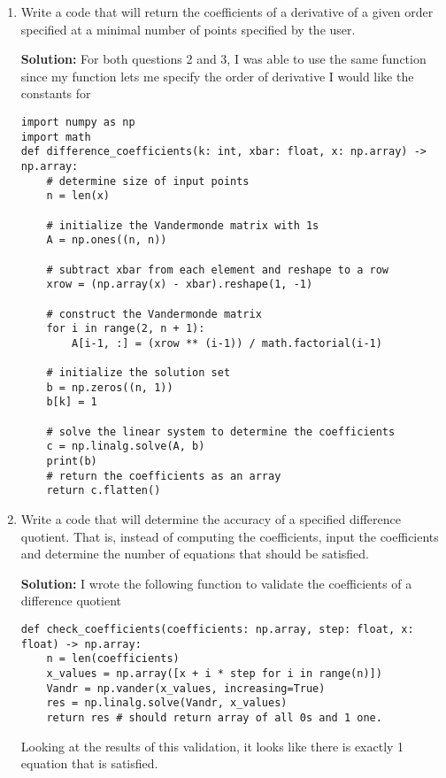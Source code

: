 \documentclass[10pt]{article}
\begin{document}
\begin{enumerate}
\item Write a code that will return the coefficients of a derivative of a given 
   order specified at a minimal number of points specified by the user.

\textbf{Solution:} For both questions 2 and 3, I was able to use the same function since my function lets me specify the order of derivative I would like the constants for

\begin{verbatim}
import numpy as np
import math
def difference_coefficients(k: int, xbar: float, x: np.array) -> np.array:
    # determine size of input points
    n = len(x)
    
    # initialize the Vandermonde matrix with 1s
    A = np.ones((n, n))
    
    # subtract xbar from each element and reshape to a row
    xrow = (np.array(x) - xbar).reshape(1, -1)
    
    # construct the Vandermonde matrix
    for i in range(2, n + 1):
        A[i-1, :] = (xrow ** (i-1)) / math.factorial(i-1)
    
    # initialize the solution set
    b = np.zeros((n, 1))
    b[k] = 1
    
    # solve the linear system to determine the coefficients
    c = np.linalg.solve(A, b)
    print(b)    
    # return the coefficients as an array
    return c.flatten()
\end{verbatim}

\item Write a code that will determine the accuracy of a specified difference
quotient. That is, instead of computing the coefficients, input the
coefficients and determine the number of equations that should be satisfied. 

\textbf{Solution:} I wrote the following function to validate the coefficients of a difference quotient
\begin{verbatim}
def check_coefficients(coefficients: np.array, step: float, x: float) -> np.array:
    n = len(coefficients)
    x_values = np.array([x + i * step for i in range(n)])
    Vandr = np.vander(x_values, increasing=True)
    res = np.linalg.solve(Vandr, x_values)
    return res # should return array of all 0s and 1 one.
\end{verbatim}

Looking at the results of this validation, it looks like there is exactly 1 equation that is satisfied.
\end{enumerate}


\noindent \underline{\hspace{3in}}\\
\end{document}
